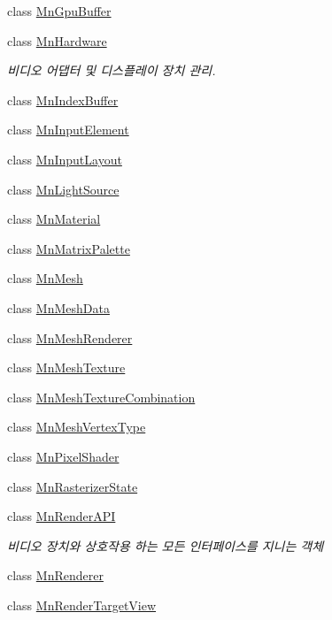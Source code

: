 \begin{DoxyCompactItemize}
class \hyperlink{class_m_n_l_1_1_mn_gpu_buffer}{Mn\+Gpu\+Buffer}
\item 
class \hyperlink{class_m_n_l_1_1_mn_hardware}{Mn\+Hardware}
\begin{DoxyCompactList}\small\item\em 비디오 어댑터 및 디스플레이 장치 관리. \end{DoxyCompactList}\item 
class \hyperlink{class_m_n_l_1_1_mn_index_buffer}{Mn\+Index\+Buffer}
\item 
class \hyperlink{class_m_n_l_1_1_mn_input_element}{Mn\+Input\+Element}
\item 
class \hyperlink{class_m_n_l_1_1_mn_input_layout}{Mn\+Input\+Layout}
\item 
class \hyperlink{class_m_n_l_1_1_mn_light_source}{Mn\+Light\+Source}
\item 
class \hyperlink{class_m_n_l_1_1_mn_material}{Mn\+Material}
\item 
class \hyperlink{class_m_n_l_1_1_mn_matrix_palette}{Mn\+Matrix\+Palette}
\item 
class \hyperlink{class_m_n_l_1_1_mn_mesh}{Mn\+Mesh}
\item 
class \hyperlink{class_m_n_l_1_1_mn_mesh_data}{Mn\+Mesh\+Data}
\item 
class \hyperlink{class_m_n_l_1_1_mn_mesh_renderer}{Mn\+Mesh\+Renderer}
\item 
class \hyperlink{class_m_n_l_1_1_mn_mesh_texture}{Mn\+Mesh\+Texture}
\item 
class \hyperlink{class_m_n_l_1_1_mn_mesh_texture_combination}{Mn\+Mesh\+Texture\+Combination}
\item 
class \hyperlink{class_m_n_l_1_1_mn_mesh_vertex_type}{Mn\+Mesh\+Vertex\+Type}
\item 
class \hyperlink{class_m_n_l_1_1_mn_pixel_shader}{Mn\+Pixel\+Shader}
\item 
class \hyperlink{class_m_n_l_1_1_mn_rasterizer_state}{Mn\+Rasterizer\+State}
\item 
class \hyperlink{class_m_n_l_1_1_mn_render_a_p_i}{Mn\+Render\+A\+PI}
\begin{DoxyCompactList}\small\item\em 비디오 장치와 상호작용 하는 모든 인터페이스를 지니는 객체 \end{DoxyCompactList}\item 
class \hyperlink{class_m_n_l_1_1_mn_renderer}{Mn\+Renderer}
\item 
class \hyperlink{class_m_n_l_1_1_mn_render_target_view}{Mn\+Render\+Target\+View}

\end{DoxyCompactItemize}
